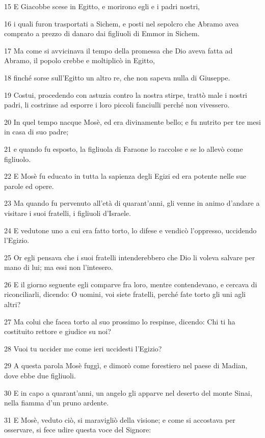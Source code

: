 \par 15 E Giacobbe scese in Egitto, e morirono egli e i padri nostri,
\par 16 i quali furon trasportati a Sichem, e posti nel sepolcro che Abramo avea comprato a prezzo di danaro dai figliuoli di Emmor in Sichem.
\par 17 Ma come si avvicinava il tempo della promessa che Dio aveva fatta ad Abramo, il popolo crebbe e moltiplicò in Egitto,
\par 18 finché sorse sull'Egitto un altro re, che non sapeva nulla di Giuseppe.
\par 19 Costui, procedendo con astuzia contro la nostra stirpe, trattò male i nostri padri, li costrinse ad esporre i loro piccoli fanciulli perché non vivessero.
\par 20 In quel tempo nacque Mosè, ed era divinamente bello; e fu nutrito per tre mesi in casa di suo padre;
\par 21 e quando fu esposto, la figliuola di Faraone lo raccolse e se lo allevò come figliuolo.
\par 22 E Mosè fu educato in tutta la sapienza degli Egizi ed era potente nelle sue parole ed opere.
\par 23 Ma quando fu pervenuto all'età di quarant'anni, gli venne in animo d'andare a visitare i suoi fratelli, i figliuoli d'Israele.
\par 24 E vedutone uno a cui era fatto torto, lo difese e vendicò l'oppresso, uccidendo l'Egizio.
\par 25 Or egli pensava che i suoi fratelli intenderebbero che Dio li voleva salvare per mano di lui; ma essi non l'intesero.
\par 26 E il giorno seguente egli comparve fra loro, mentre contendevano, e cercava di riconciliarli, dicendo: O uomini, voi siete fratelli, perché fate torto gli uni agli altri?
\par 27 Ma colui che facea torto al suo prossimo lo respinse, dicendo: Chi ti ha costituito rettore e giudice su noi?
\par 28 Vuoi tu uccider me come ieri uccidesti l'Egizio?
\par 29 A questa parola Mosè fuggì, e dimorò come forestiero nel paese di Madian, dove ebbe due figliuoli.
\par 30 E in capo a quarant'anni, un angelo gli apparve nel deserto del monte Sinai, nella fiamma d'un pruno ardente.
\par 31 E Mosè, veduto ciò, si maravigliò della visione; e come si accostava per osservare, si fece udire questa voce del Signore:
